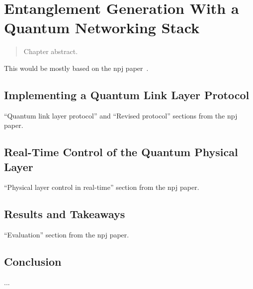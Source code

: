 \chapter{Entanglement Generation With a Quantum Networking Stack}
\label{chp:netstack}

\begin{refsection}

\begin{abstract}
Chapter abstract.
\end{abstract}


\newpage

\noindent
This would be mostly based on the npj paper~\cite{pompili_experimental_2022}.

\section{Implementing a Quantum Link Layer Protocol}

``Quantum link layer protocol'' and ``Revised protocol'' sections from the npj paper.

\section{Real-Time Control of the Quantum Physical Layer}

``Physical layer control in real-time'' section from the npj paper.

\section{Results and Takeaways}

``Evaluation'' section from the npj paper.

\section{Conclusion}

...

\printbibliography[heading=subbibintoc,title={References}]

\end{refsection}
